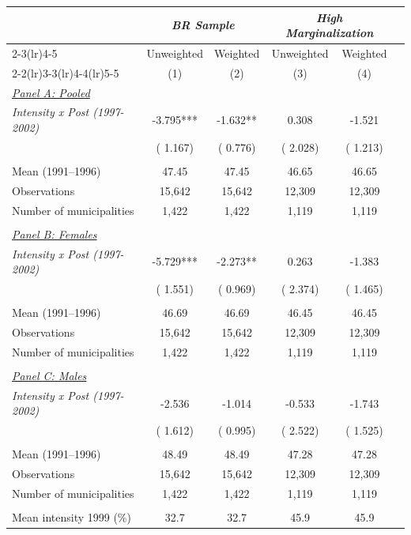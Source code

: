 \begin{tabular}{lccccc} \hline \hline
& \multicolumn{2}{c}{\textit{BR Sample}} 
& \multicolumn{2}{c}{\textit{High Marginalization}} \\ \cmidrule(lr){2-3}\cmidrule(lr){4-5}
& \multicolumn{1}{c}{Unweighted} & \multicolumn{1}{c}{Weighted} & \multicolumn{1}{c}{Unweighted} & \multicolumn{1}{c}{Weighted} \\ 
\cmidrule(lr){2-2}\cmidrule(lr){3-3}\cmidrule(lr){4-4}\cmidrule(lr){5-5}
& \multicolumn{1}{c}{(1)} & \multicolumn{1}{c}{(2)} & \multicolumn{1}{c}{(3)} & \multicolumn{1}{c}{(4)} \\ \toprule
\underline{\textit{Panel A: Pooled}} \\ 
\textit{Intensity x Post (1997-2002)}&    -3.795***&    -1.632**&     0.308&    -1.521 \\ 
 & (    1.167)& (    0.776)& (    2.028)& (    1.213) \\ 
  & & & & \\ 
Mean (1991--1996)&     47.45&     47.45&     46.65&     46.65 \\ 
Observations&     15,642&     15,642&     12,309&     12,309 \\ 
Number of municipalities&      1,422&      1,422&      1,119&      1,119 \\ 
  & & & & \\ 
\underline{\textit{Panel B: Females}} \\ 
\textit{Intensity x Post (1997-2002)}&    -5.729***&    -2.273**&     0.263&    -1.383 \\ 
 & (    1.551)& (    0.969)& (    2.374)& (    1.465) \\ 
  & & & & \\ 
Mean (1991--1996)&     46.69&     46.69&     46.45&     46.45 \\ 
Observations&     15,642&     15,642&     12,309&     12,309 \\ 
Number of municipalities&      1,422&      1,422&      1,119&      1,119 \\ 
  & & & & \\ 
\underline{\textit{Panel C: Males}} \\ 
\textit{Intensity x Post (1997-2002)}&    -2.536&    -1.014&    -0.533&    -1.743 \\ 
 & (    1.612)& (    0.995)& (    2.522)& (    1.525) \\ 
  & & & & \\ 
Mean (1991--1996)&     48.49&     48.49&     47.28&     47.28 \\ 
Observations&     15,642&     15,642&     12,309&     12,309 \\ 
Number of municipalities&      1,422&      1,422&      1,119&      1,119 \\ 
  & & & & \\ 
Mean intensity 1999 (\%) &   32.7 &   32.7 &   45.9 &   45.9 \\ 
\bottomrule
\end{tabular}